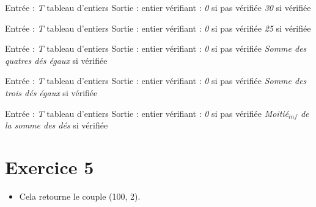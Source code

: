 \documentclass{article}
\begin{document}
\begin{algorithm}[H]
    \caption{\textbf{: Petite suite}}
    \begin{algorithmic}
        \State Entrée : \textit{T} tableau d'entiers
        \State Sortie : entier vérifiant : 
        \State \Return \textit{0} si pas vérifiée
        \State \Return \textit{30} si vérifiée
    \end{algorithmic}
\end{algorithm}

\begin{algorithm}[H]
    \caption{\textbf{: Full}}
    \begin{algorithmic}
        \State Entrée : \textit{T} tableau d'entiers
        \State Sortie : entier vérifiant : 
        \State \Return \textit{0} si pas vérifiée
        \State \Return \textit{25} si vérifiée
    \end{algorithmic}
\end{algorithm}

\begin{algorithm}[H]
    \caption{\textbf{: Carré }}
    \begin{algorithmic}
        \State Entrée : \textit{T} tableau d'entiers
        \State Sortie : entier vérifiant : 
        \State \Return \textit{0} si pas vérifiée
        \State \Return \textit{Somme des quatres dés égaux} si vérifiée
    \end{algorithmic}
\end{algorithm}

\begin{algorithm}[H]
    \caption{\textbf{: Brelan}}
    \begin{algorithmic}
        \State Entrée : \textit{T} tableau d'entiers
        \State Sortie : entier vérifiant : 
        \State \Return \textit{0} si pas vérifiée
        \State \Return \textit{Somme des trois dés égaux} si vérifiée
    \end{algorithmic}
\end{algorithm}

\begin{algorithm}[H]
    \caption{\textbf{: Chance}}
    \begin{algorithmic}
        \State Entrée : \textit{T} tableau d'entiers
        \State Sortie : entier vérifiant : 
        \State \Return \textit{0} si pas vérifiée
        \State \Return \textit{Moitié$_{inf}$ de la somme des dés} si vérifiée
    \end{algorithmic}
\end{algorithm}

\section{Exercice 5}
\begin{itemize}
    \item Cela retourne le couple (100, 2).
\end{itemize}
\end{document}
